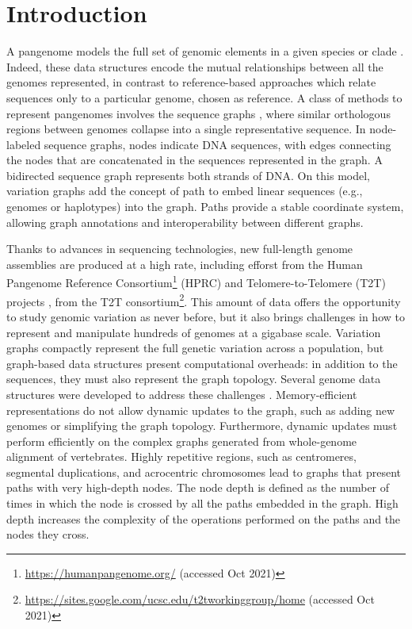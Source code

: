 \documentclass{bioinfo}
\begin{document}
\maketitle

\section{Introduction}

A pangenome models the full set of genomic elements in a given species or clade \citep{Eizenga_2020}. Indeed, these data structures encode the mutual relationships between all the genomes represented, in contrast to reference-based approaches which relate sequences only to a particular genome, chosen as reference. A class of methods to represent pangenomes involves the sequence graphs \citep{Paten:2017}, where similar orthologous regions between genomes collapse into a single representative sequence. In node-labeled sequence graphs, nodes indicate DNA sequences, with edges connecting the nodes that are concatenated in the sequences represented in the graph. A bidirected sequence graph represents both strands of DNA. On this model, variation graphs add the concept of path to embed linear sequences (e.g., genomes or haplotypes) into the graph. Paths provide a stable coordinate system, allowing graph annotations and interoperability between different graphs.

Thanks to advances in sequencing technologies, new full-length genome assemblies are produced at a high rate, including efforst from the Human Pangenome Reference Consortium\footnote{\url{https://humanpangenome.org/} (accessed Oct 2021)} (HPRC) and Telomere-to-Telomere (T2T) projects \citep{Miga:2020, Logsdon_2021, Nurk_2021}, from the T2T consortium\footnote{\url{https://sites.google.com/ucsc.edu/t2tworkinggroup/home} (accessed Oct 2021)}. This amount of data offers the opportunity to study genomic variation as never before, but it also brings challenges in how to represent and manipulate hundreds of genomes at a gigabase scale. Variation graphs compactly represent the full genetic variation across a population, but graph-based data structures present computational overheads: in addition to the sequences, they must also represent the graph topology. Several genome data structures were developed to address these challenges \citep{Eizenga_2020_BX}. Memory-efficient representations do not allow dynamic updates to the graph, such as adding new genomes or simplifying the graph topology. Furthermore, dynamic updates must perform efficiently on the complex graphs generated from whole-genome alignment of vertebrates. Highly repetitive regions, such as centromeres, segmental duplications, and acrocentric chromosomes lead to graphs that present paths with very high-depth nodes. The node depth is defined as the number of times in which the node is crossed by all the paths embedded in the graph. High depth increases the complexity of the operations performed on the paths and the nodes they cross.
\end{document}
